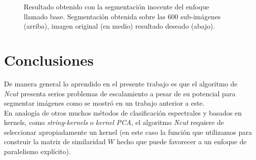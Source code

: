 \documentclass[conference]{IEEEtran}
\begin{document}
\begin{figure}[htbp]
\caption{Resultado obtenido con la segmentación inocente del enfoque llamado base. Segmentación obtenida sobre las 600 sub-imágenes (arriba), imagen original (en medio) resultado deseado (abajo).}
\label{res_base}
\end{figure}
\FloatBarrier






\section{Conclusiones}
De manera general lo aprendido en el presente trabajo es que el algoritmo de \textit{Ncut} presenta serios problemas de escalamiento a pesar de su potencial para segmentar imágenes como se mostró en un trabajo anterior a este.\\

En analogía de otros muchos métodos de clasificación espectrales y basados en kernels, como \textit{string-kernels} o \textit{kernel PCA}, el algoritmo \textit{Ncut} requiere de seleccionar apropiadamente un kernel (en este caso la función que utilizamos para construir la matriz de similaridad $W$ hecho que puede favorecer a un enfoque de paralelismo explícito).\\
\end{document}

